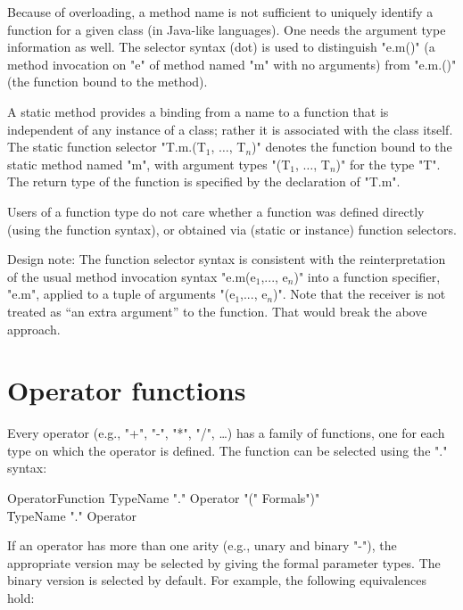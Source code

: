 \begin{note}
Because of overloading, a method name is not sufficient to
uniquely identify a function for a given class (in Java-like languages).
One needs the argument type information as well.
The selector syntax (dot) is used to distinguish \xcd"e.m()" (a
method invocation on \xcd"e" of method named \xcd"m" with no arguments)
from \xcd"e.m.()"
(the function bound to the method). 
\end{note}

A static method provides a binding from a name to a function that is
independent of any instance of a class; rather it is associated with the
class itself. The static function selector
\xcdmath"T.m.(T$_1$, $\dots$, T$_n$)" denotes the
function bound to the static method named \xcd"m", with argument types
\xcdmath"(T$_1$, $\dots$, T$_n$)" for the type \xcd"T". The return type
of the function is specified by the declaration of \xcd"T.m".

Users of a function type do not care whether a function was defined
directly (using the function syntax), or obtained via (static or
instance) function selectors.

\begin{note}
Design note: The function selector syntax is consistent with the
reinterpretation of the usual method invocation syntax
\xcdmath"e.m(e$_1$,..., e$_n$)"
into a function specifier, \xcd"e.m", applied to a tuple of arguments
\xcdmath"(e$_1$,..., e$_n$)". Note that the receiver is not
treated as ``an extra argument'' to the
function. That would break the above approach.
\end{note}


\section{Operator functions}

Every operator (e.g.,
\xcd"+",
\xcd"-",
\xcd"*",
\xcd"/",
\dots) has a family of functions, one for
each type on which the operator is defined. The function can be
selected using the "." syntax:

\begin{grammar}
OperatorFunction
        \: TypeName \xcd"." Operator \xcd"(" Formals\opt \xcd")" \\
        \| TypeName \xcd"." Operator \\
\end{grammar}

If an operator has more than one arity (e.g., unary and binary
\xcd"-"), the appropriate version may be selected by giving the
formal parameter types.  The binary version is selected by
default.
For example, the following equivalences hold:

